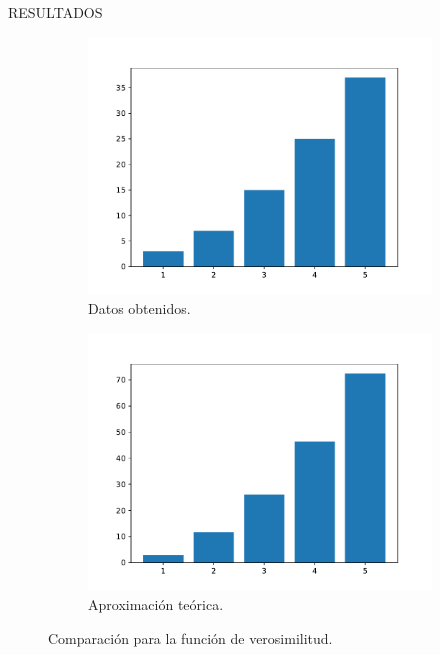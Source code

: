 \begin{frame}{RESULTADOS}
    \begin{figure}[H]
      \centering
      \begin{subfigure}[H]{0.4\textwidth}
        \includegraphics[scale = 0.33]{files/1.pdf}
        \centering
        \caption{Datos obtenidos.}
      \end{subfigure}
      \hspace{1.3cm}
      \begin{subfigure}[H]{0.4\textwidth}
        \includegraphics[scale = 0.33]{files/2.pdf}
        \centering
        \caption{Aproximación teórica.}
      \end{subfigure}
      \caption{Comparación para la función de verosimilitud.}
      \label{img:timeresults}
    \end{figure}
\end{frame}

